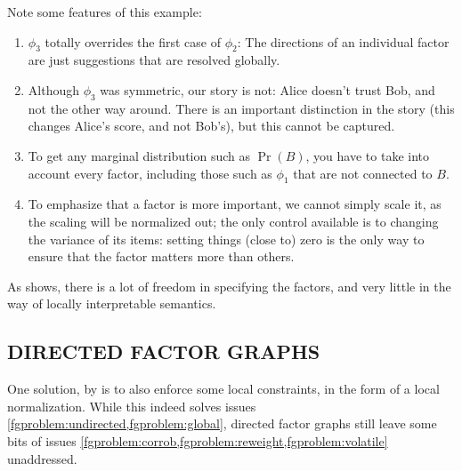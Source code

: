 \documentclass{article}
\numberwithin{equation}{section}
\begin{document}
\begin{example}
		
		Note some features of this example:
		\begin{enumerate}[nosep]
				\item $\phi_3$ totally overrides the first case of $\phi_2$: The
  directions of an individual factor are just suggestions that are
  resolved globally. 
\item Although $\phi_3$ was symmetric, our
						  story is not: Alice doesn't trust Bob, and
						  not the other way around. There is an
						  important distinction in the story (this
						  changes Alice's score, and not Bob's), but
						  this cannot be captured. 
			\item To get any marginal distribution such as $\Pr(B)$, you have to take into account every factor, including those such as $\phi_1$ that are not connected to $B$.
			\item To emphasize that a factor is more important, we cannot simply scale it, as the scaling will be normalized out; the only control available is to changing the variance of its items: setting things (close to) zero is the only way to ensure that the factor matters more than others.
		\end{enumerate}
	\end{example}
As  shows, there is a lot of freedom in specifying the factors, 
	and very little in the way of locally interpretable semantics. 


	\subsection{DIRECTED FACTOR GRAPHS}
	
	One solution, by \parencite{frey2012extending} is to also enforce some local constraints, in the form of a local normalization.  While this indeed solves issues \cref{fgproblem:undirected,fgproblem:global}, directed factor graphs still leave some bits of issues \cref{fgproblem:corrob,fgproblem:reweight,fgproblem:volatile} unaddressed.
	
\end{document}
